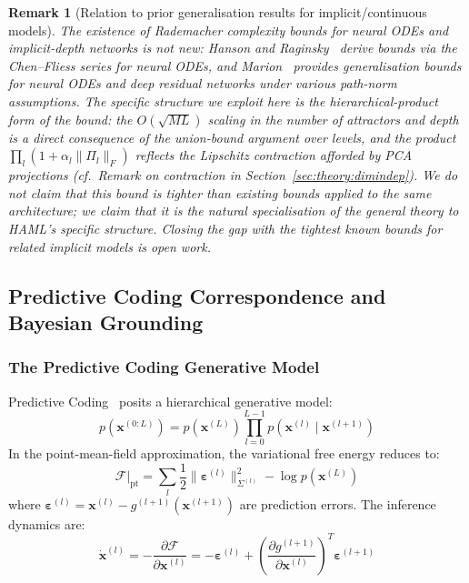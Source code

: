 \documentclass[11pt,a4paper]{article}
\newtheorem{remark}[theorem]{Remark}
\begin{document}
\begin{remark}[Relation to prior generalisation results for implicit/continuous models]
The existence of Rademacher complexity bounds for neural ODEs and implicit-depth networks
is not new: Hanson and Raginsky~\cite{hanson2024rademacher} derive bounds via the
Chen--Fliess series for neural ODEs, and Marion~\cite{marion2023generalization} provides
generalisation bounds for neural ODEs and deep residual networks under various path-norm
assumptions. The specific structure we exploit here is the
\emph{hierarchical-product form} of the bound: the $O(\sqrt{ML})$ scaling in the number
of attractors and depth is a direct consequence of the union-bound argument over levels,
and the product $\prod_l (1 + \alpha_l\|\Pi_l\|_F)$ reflects the Lipschitz contraction
afforded by PCA projections (cf.\ Remark on contraction in Section~\ref{sec:theory:dimindep}).
We do \emph{not} claim that this bound is tighter than existing bounds applied to the
same architecture; we claim that it is the natural specialisation of the general theory to
HAML's specific structure. Closing the gap with the tightest known bounds for related
implicit models is open work.
\end{remark}

\subsection{Predictive Coding Correspondence and Bayesian Grounding}
\label{sec:theory:bayes}

\subsubsection{The Predictive Coding Generative Model}

Predictive Coding~\cite{rao1999predictive,friston2005theory} posits a hierarchical
generative model:
\begin{equation}
  p(\mathbf{x}^{(0:L)}) = p(\mathbf{x}^{(L)}) \prod_{l=0}^{L-1}
    p(\mathbf{x}^{(l)} \mid \mathbf{x}^{(l+1)})
\end{equation}
In the point-mean-field approximation, the variational free energy reduces to:
\begin{equation}
  \mathcal{F}\big|_{\mathrm{pt}} =
    \sum_l \frac{1}{2}\|\boldsymbol{\varepsilon}^{(l)}\|^2_{\Sigma^{(l)}}
    - \log p(\mathbf{x}^{(L)})
\end{equation}
where $\boldsymbol{\varepsilon}^{(l)} = \mathbf{x}^{(l)} - g^{(l+1)}(\mathbf{x}^{(l+1)})$
are prediction errors. The inference dynamics are:
\begin{equation}
  \dot{\mathbf{x}}^{(l)} = -\frac{\partial \mathcal{F}}{\partial \mathbf{x}^{(l)}}
    = -\boldsymbol{\varepsilon}^{(l)}
    + \left(\frac{\partial g^{(l+1)}}{\partial \mathbf{x}^{(l)}}\right)^T
      \boldsymbol{\varepsilon}^{(l+1)}
\end{equation}
\end{document}
